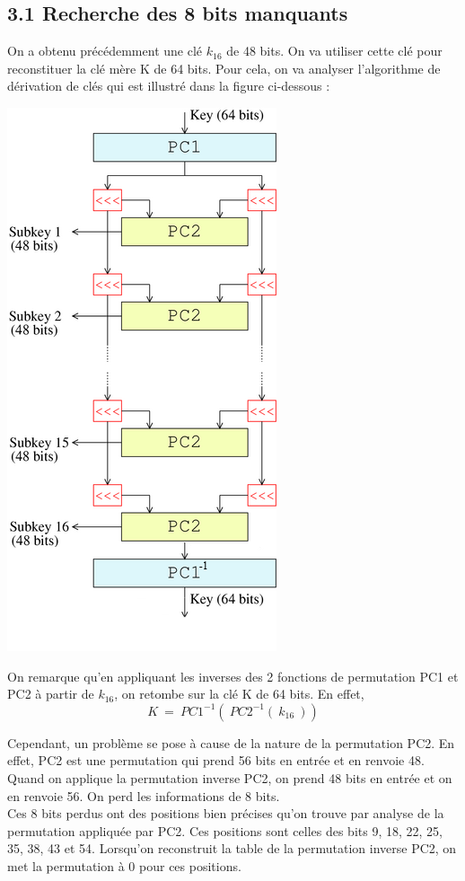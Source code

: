 		\subsection*{3.1 Recherche des 8 bits manquants}
			On a obtenu précédemment une clé $k_{16}$ de 48 bits. On va utiliser cette clé pour reconstituer la clé mère K de 64 bits. Pour cela, on va analyser l'algorithme de dérivation de clés qui est illustré dans la figure ci-dessous :
			\begin{center}\includegraphics[scale=0.5]{KEY.png}\end{center}
			
			On remarque qu'en appliquant les inverses des 2 fonctions de permutation PC1 et PC2 à partir de $k_{16}$, on retombe sur la clé K de 64 bits. En effet,
			\[K\ =\ PC1^{-1}(\ PC2^{-1}(\ k_{16}\ ))\]
			
			Cependant, un problème se pose à cause de la nature de la permutation PC2. En effet, PC2 est une permutation qui prend 56 bits en entrée et en renvoie 48. Quand on applique la permutation inverse PC2, on prend 48 bits en entrée et on en renvoie 56. On perd les informations de 8 bits.\\
			\indent Ces 8 bits perdus ont des positions bien précises qu'on trouve par analyse de la permutation appliquée par PC2. Ces positions sont celles des bits 9, 18, 22, 25, 35, 38, 43 et 54. Lorsqu'on reconstruit la table de la permutation inverse PC2, on met la permutation à 0 pour ces positions.
			
